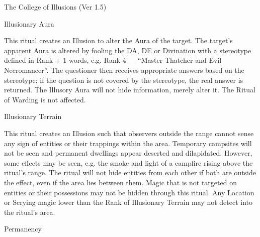 \begin{Chapter}{The College of Illusions (Ver 1.5)}
\begin{ritual}[R-1]{Illusionary Aura}
\begin{effects}
This ritual creates an Illusion to alter the Aura of the target.  The
target’s apparent Aura is altered by fooling the DA, DE or Divination
with a stereotype defined in Rank + 1 words, e.g. Rank 4 --- “Master
Thatcher and Evil Necromancer”.  The questioner then receives
appropriate answers based on the stereotype; if the question is not
covered by the stereotype, the real answer is returned.  The Illusory
Aura will not hide information, merely alter it. The Ritual of Warding
is not affected.
\end{effects}
\end{ritual}

\begin{ritual}[R-2]{Illusionary Terrain}

\begin{effects}
This ritual creates an Illusion such that observers outside the range
cannot sense any sign of entities or their trappings within the area.
Temporary campsites will not be seen and permanent dwellings appear
deserted and dilapidated.  However, some effects may be seen, e.g. the
smoke and light of a campfire rising above the ritual’s range.  The
ritual will not hide entities from each other if both are outside the
effect, even if the area lies between them.  Magic that is not
targeted on entities or their possessions may not be hidden through
this ritual.  Any Location or Scrying magic lower than the Rank of
Illusionary Terrain may not detect into the ritual’s area.
\end{effects}
\end{ritual}

\begin{ritual}[R-3]{Permanency}


\end{ritual}
\end{Chapter}
